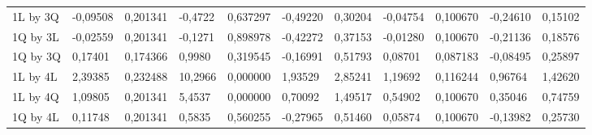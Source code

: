 \begin{table}[]
{\begin{tabular}{lllllllllll}
\rowcolor[HTML]{FFFFFF} 
{\color[HTML]{000000} 1L by 3Q}       & {\color[HTML]{181A1B} -0,09508} & {\color[HTML]{181A1B} 0,201341} & {\color[HTML]{181A1B} -0,4722}  & {\color[HTML]{181A1B} 0,637297} & {\color[HTML]{181A1B} -0,49220}       & {\color[HTML]{181A1B} 0,30204}        & {\color[HTML]{181A1B} -0,04754} & {\color[HTML]{181A1B} 0,100670}      & {\color[HTML]{181A1B} -0,24610}       & {\color[HTML]{181A1B} 0,15102}        \\
\rowcolor[HTML]{FFFFFF} 
{\color[HTML]{000000} 1Q by 3L}       & {\color[HTML]{181A1B} -0,02559} & {\color[HTML]{181A1B} 0,201341} & {\color[HTML]{181A1B} -0,1271}  & {\color[HTML]{181A1B} 0,898978} & {\color[HTML]{181A1B} -0,42272}       & {\color[HTML]{181A1B} 0,37153}        & {\color[HTML]{181A1B} -0,01280} & {\color[HTML]{181A1B} 0,100670}      & {\color[HTML]{181A1B} -0,21136}       & {\color[HTML]{181A1B} 0,18576}        \\
\rowcolor[HTML]{FFFFFF} 
{\color[HTML]{000000} 1Q by 3Q}       & {\color[HTML]{181A1B} 0,17401}  & {\color[HTML]{181A1B} 0,174366} & {\color[HTML]{181A1B} 0,9980}   & {\color[HTML]{181A1B} 0,319545} & {\color[HTML]{181A1B} -0,16991}       & {\color[HTML]{181A1B} 0,51793}        & {\color[HTML]{181A1B} 0,08701}  & {\color[HTML]{181A1B} 0,087183}      & {\color[HTML]{181A1B} -0,08495}       & {\color[HTML]{181A1B} 0,25897}        \\
\rowcolor[HTML]{FFFFFF} 
{\color[HTML]{000000} 1L by 4L}       & {\color[HTML]{FF0000} 2,39385}  & {\color[HTML]{FF0000} 0,232488} & {\color[HTML]{FF0000} 10,2966}  & {\color[HTML]{FF0000} 0,000000} & {\color[HTML]{FF0000} 1,93529}        & {\color[HTML]{FF0000} 2,85241}        & {\color[HTML]{FF0000} 1,19692}  & {\color[HTML]{FF0000} 0,116244}      & {\color[HTML]{FF0000} 0,96764}        & {\color[HTML]{FF0000} 1,42620}        \\
\rowcolor[HTML]{FFFFFF} 
{\color[HTML]{000000} 1L by 4Q}       & {\color[HTML]{FF0000} 1,09805}  & {\color[HTML]{FF0000} 0,201341} & {\color[HTML]{FF0000} 5,4537}   & {\color[HTML]{FF0000} 0,000000} & {\color[HTML]{FF0000} 0,70092}        & {\color[HTML]{FF0000} 1,49517}        & {\color[HTML]{FF0000} 0,54902}  & {\color[HTML]{FF0000} 0,100670}      & {\color[HTML]{FF0000} 0,35046}        & {\color[HTML]{FF0000} 0,74759}        \\
\rowcolor[HTML]{FFFFFF} 
{\color[HTML]{000000} 1Q by 4L}       & {\color[HTML]{181A1B} 0,11748}  & {\color[HTML]{181A1B} 0,201341} & {\color[HTML]{181A1B} 0,5835}   & {\color[HTML]{181A1B} 0,560255} & {\color[HTML]{181A1B} -0,27965}       & {\color[HTML]{181A1B} 0,51460}        & {\color[HTML]{181A1B} 0,05874}  & {\color[HTML]{181A1B} 0,100670}      & {\color[HTML]{181A1B} -0,13982}       & {\color[HTML]{181A1B} 0,25730}        \\

\end{tabular}}
\end{table}
